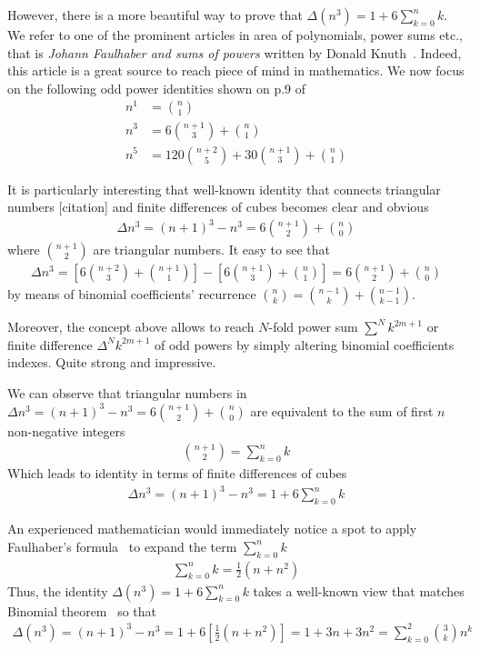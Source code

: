 However, there is a more beautiful way to prove that $\Delta(n^3) = 1 + 6 \sum_{k=0}^{n} k$.
We refer to one of the prominent articles in area of polynomials, power sums etc.,
that is \textit{Johann Faulhaber and sums of powers} written by Donald Knuth~\cite{knuth1993johann}.
Indeed, this article is a great source to reach piece of mind in mathematics.
We now focus on the following odd power identities shown on p.9 of~\cite{knuth1993johann}
\begin{align*}
    n^1 &= \binom{n}{1} \\
    n^3 &= 6 \binom{n+1}{3} + \binom{n}{1} \\
    n^5 &= 120 \binom{n+2}{5} + 30 \binom{n+1}{3} + \binom{n}{1}
\end{align*}

It is particularly interesting that well-known identity that connects triangular numbers [citation]
and finite differences of cubes becomes clear and obvious
\begin{align*}
    \Delta n^3 = (n+1)^3 - n^3
    =  6 \binom{n+1}{2} + \binom{n}{0}
\end{align*}
where $\binom{n+1}{2}$ are triangular numbers.
It easy to see that
\begin{align*}
    \Delta n^3 = \left[ 6 \binom{n+2}{3} + \binom{n+1}{1} \right] - \left[ 6 \binom{n+1}{3} + \binom{n}{1} \right] = 6 \binom{n+1}{2} + \binom{n}{0}
\end{align*}
by means of binomial coefficients' recurrence $\binom{n}{k} = \binom{n-1}{k} + \binom{n-1}{k-1}$.

Moreover, the concept above allows to reach $N$-fold power sum $\sum^N k^{2m+1}$
or finite difference $\Delta^N k^{2m+1}$ of odd powers by simply altering
binomial coefficients indexes.
Quite strong and impressive.

We can observe that triangular
numbers in $\Delta n^3 = (n+1)^3 - n^3 =  6 \binom{n+1}{2} + \binom{n}{0}$
are equivalent to the sum of first $n$ non-negative integers
\begin{align*}
    \binom{n+1}{2} = \sum_{k=0}^{n} k
\end{align*}
Which leads to identity in terms of finite differences of cubes
\begin{align*}
    \Delta n^3 = (n+1)^3 - n^3 = 1 + 6 \sum_{k=0}^{n} k
\end{align*}

An experienced mathematician would immediately notice a spot to apply Faulhaber's formula~\cite{beardon1996sums}
to expand the term $\sum_{k=0}^{n} k$
\begin{align*}
    \sum_{k=0}^{n} k = \frac{1}{2}(n+n^2)
\end{align*}
Thus, the identity $\Delta(n^3) = 1 + 6 \sum_{k=0}^{n} k$ takes a well-known view
that matches Binomial theorem~\cite{abramowitz1988handbook}
so that
\begin{align*}
    \Delta(n^3) = (n+1)^3 - n^3
    = 1 + 6 \left[ \frac{1}{2}(n+n^2) \right]
    = 1 + 3 n + 3 n^2
    = \sum_{k=0}^{2} \binom{3}{k} n^k
\end{align*}

